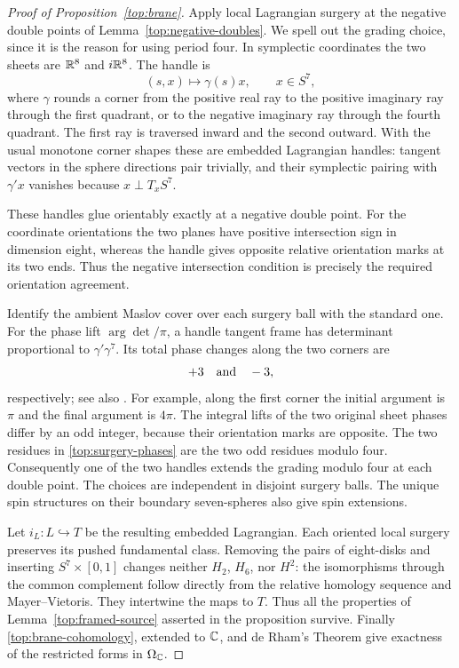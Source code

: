 \begin{proof}[Proof of Proposition~\ref{top:brane}]
Apply local Lagrangian surgery at the negative double points
of Lemma~\ref{top:negative-doubles}.  We spell out the
grading choice, since it is the reason for using period four.
In symplectic coordinates the two sheets are
$\mathbb R^8$ and $i\mathbb R^8$.  The handle is
\[
 (s,x)\longmapsto\gamma(s)x,\qquad x\in S^7,
\]
where $\gamma$ rounds a corner from the positive real ray
to the positive imaginary ray through the first quadrant,
or to the negative imaginary ray through the fourth
quadrant.  The first ray is traversed inward and the second
outward.  With the usual monotone corner shapes these are
embedded Lagrangian handles: tangent vectors in the sphere
directions pair trivially, and their symplectic pairing
with $\gamma' x$ vanishes because $x\perp T_xS^7$.

These handles glue orientably exactly at a negative double
point.  For the coordinate orientations the two planes have
positive intersection sign in dimension eight, whereas
the handle gives opposite relative orientation marks at
its two ends.  Thus the negative intersection condition is
precisely the required orientation agreement.

Identify the ambient Maslov cover over each surgery ball
with the standard one.  For the phase lift $\arg\det/\pi$, a handle tangent frame
has determinant proportional to $\gamma'\gamma^7$.
Its total phase changes along the two corners are
\begin{equation}\label{top:surgery-phases}
 +3\quad\hbox{and}\quad-3,
\end{equation}
respectively; see also \cite[Lemma~2.4]{ekholm-smith}.
For example, along the first corner the initial argument
is $\pi$ and the final argument is $4\pi$.
The integral lifts of the two original sheet phases differ
by an odd integer, because their orientation marks are
opposite.  The two residues in \eqref{top:surgery-phases}
are the two odd residues modulo four.  Consequently one
of the two handles extends the grading modulo four at
each double point.  The choices are independent in
disjoint surgery balls.  The unique spin structures on
their boundary seven-spheres also give spin extensions.

Let $i_L:L\hookrightarrow T$ be the resulting embedded
Lagrangian.  Each oriented local surgery preserves its
pushed fundamental class.  Removing the pairs of
eight-disks and inserting $S^7\times[0,1]$ changes neither
$H_2$, $H_6$, nor $H^2$: the isomorphisms through the
common complement follow directly from the relative
homology sequence and Mayer--Vietoris.  They intertwine
the maps to $T$.  Thus all the properties of
Lemma~\ref{top:framed-source} asserted in the proposition
survive.  Finally \eqref{top:brane-cohomology}, extended
to $\mathbb C$, and de Rham's Theorem give exactness of the
restricted forms in $\Omega_{\mathbb C}$.
\end{proof}


